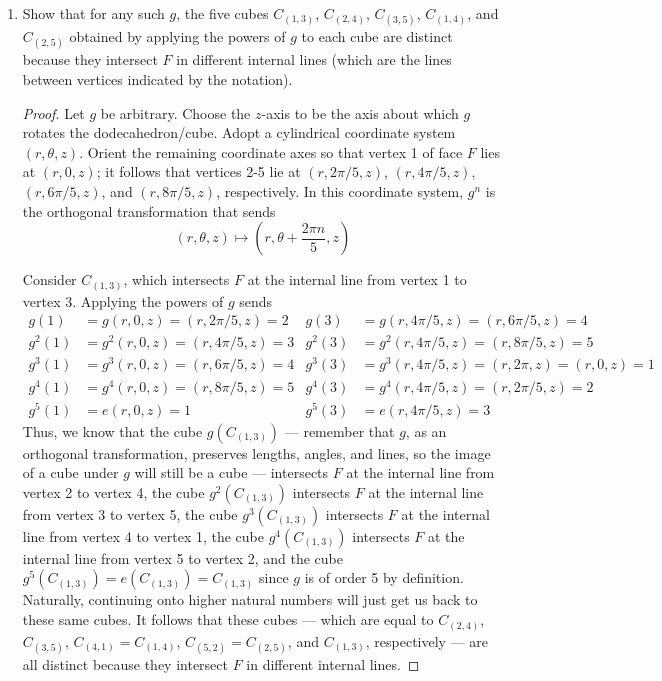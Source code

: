\documentclass[../psets.tex]{subfiles}
\begin{document}
\begin{enumerate}
\begin{enumerate}
        \item Show that for any such $g$, the five cubes $C_{(1,3)}$, $C_{(2,4)}$, $C_{(3,5)}$, $C_{(1,4)}$, and $C_{(2,5)}$ obtained by applying the powers of $g$ to each cube are distinct because they intersect $F$ in different internal lines (which are the lines between vertices indicated by the notation).
        \begin{proof}
            Let $g$ be arbitrary. Choose the $z$-axis to be the axis about which $g$ rotates the dodecahedron/cube. Adopt a cylindrical coordinate system $(r,\theta,z)$. Orient the remaining coordinate axes so that vertex 1 of face $F$ lies at $(r,0,z)$; it follows that vertices 2-5 lie at $(r,2\pi/5,z)$, $(r,4\pi/5,z)$, $(r,6\pi/5,z)$, and $(r,8\pi/5,z)$, respectively. In this coordinate system, $g^n$ is the orthogonal transformation that sends
            \begin{equation*}
                (r,\theta,z) \mapsto \left( r,\theta+\frac{2\pi n}{5},z \right)
            \end{equation*}\par
            Consider $C_{(1,3)}$, which intersects $F$ at the internal line from vertex 1 to vertex 3. Applying the powers of $g$ sends
            \begin{align*}
                g(1) &= g(r,0,z) = (r,2\pi/5,z) = 2&
                    g(3) &= g(r,4\pi/5,z) = (r,6\pi/5,z) = 4\\
                g^2(1) &= g^2(r,0,z) = (r,4\pi/5,z) = 3&
                    g^2(3) &= g^2(r,4\pi/5,z) = (r,8\pi/5,z) = 5\\
                g^3(1) &= g^3(r,0,z) = (r,6\pi/5,z) = 4&
                    g^3(3) &= g^3(r,4\pi/5,z) = (r,2\pi,z) = (r,0,z) = 1\\
                g^4(1) &= g^4(r,0,z) = (r,8\pi/5,z) = 5&
                    g^4(3) &= g^4(r,4\pi/5,z) = (r,2\pi/5,z) = 2\\
                g^5(1) &= e(r,0,z) = 1&
                    g^5(3) &= e(r,4\pi/5,z) = 3
            \end{align*}
            Thus, we know that the cube $g(C_{(1,3)})$ --- remember that $g$, as an orthogonal transformation, preserves lengths, angles, and lines, so the image of a cube under $g$ will still be a cube --- intersects $F$ at the internal line from vertex 2 to vertex 4, the cube $g^2(C_{(1,3)})$ intersects $F$ at the internal line from vertex 3 to vertex 5, the cube $g^3(C_{(1,3)})$ intersects $F$ at the internal line from vertex 4 to vertex 1, the cube $g^4(C_{(1,3)})$ intersects $F$ at the internal line from vertex 5 to vertex 2, and the cube $g^5(C_{(1,3)})=e(C_{(1,3)})=C_{(1,3)}$ since $g$ is of order 5 by definition. Naturally, continuing onto higher natural numbers will just get us back to these same cubes. It follows that these cubes --- which are equal to $C_{(2,4)}$, $C_{(3,5)}$, $C_{(4,1)}=C_{(1,4)}$, $C_{(5,2)}=C_{(2,5)}$, and $C_{(1,3)}$, respectively --- are all distinct because they intersect $F$ in different internal lines.

\end{proof}
\end{enumerate}
\end{enumerate}
\end{document}
